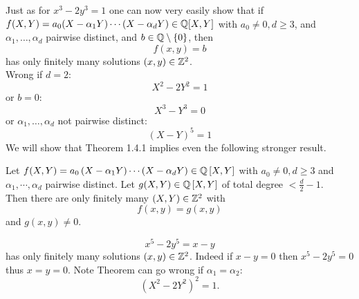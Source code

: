 \documentclass[NumTh.tex]{subfiles}
\begin{document}
Just as for $x^3-2y^3=1$ one can now very easily show that if $f(X,Y)=a_0 (X-\alpha_1 Y)\cdots(X-\alpha_d Y)\in\mathbb{Q}[X,Y]$ with $a_0\ne0, d\ge 3$, and $\alpha_1,\dots,\alpha_d$ pairwise distinct, and $b\in\mathbb{Q}\setminus\left\{0\right\}$, then
$$f(x,y)=b$$
has only finitely many solutions $\left(x,y\right)\in\mathbb{Z}^2$. \\
Wrong if $d=2$:
$$X^2-2Y^2=1$$
or $b=0$:
$$X^3-Y^3=0$$
or $\alpha_1,\dots,\alpha_d$ not pairwise distinct: 
$$(X-Y)^5=1$$
We will show that Theorem 1.4.1 implies even the following stronger result. 

\begin{theorem}\label{1_4_2}
Let $f(X,Y)=a_0 \left(X-\alpha_1 Y\right)\cdots\allowbreak\left(X-\alpha_d Y\right)\in\mathbb{Q}\left[X,Y\right]$ with $a_0\ne 0, d\ge 3$ and $\alpha_1,\cdots,\alpha_d$ pairwise distinct. Let $g(X,Y)\in\mathbb{Q}\left[X,Y\right]$ of total degree $<\frac{d}{2}-1$. 
\\
Then there are only finitely many $(X,Y)\in\mathbb{Z}^2$ with
$$f(x,y)=g(x,y)$$
and
$g(x,y)\ne 0$.
\end{theorem}

\begin{ex}
$$x^5-2y^5=x-y$$
has only finitely many solutions $\left(x,y\right)\in\mathbb{Z}^2$. Indeed if $x-y=0$ then $x^5-2y^5=0$ thus $x=y=0$. 
Note Theorem can go wrong if $\alpha_1=\alpha_2$: 
$$(X^2-2Y^2 )^2=1.$$
\end{ex}
\end{document}
